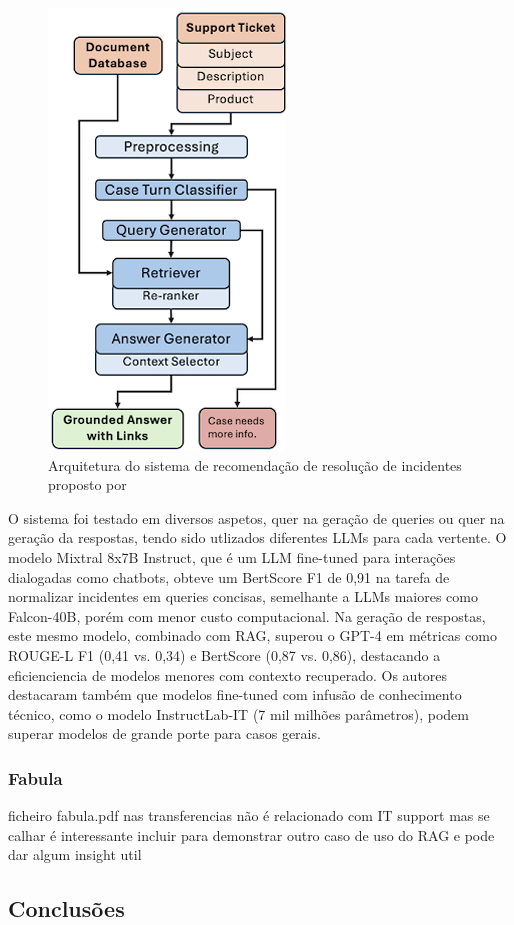 \begin{figure}[H]
        \centering
        \includegraphics[width=0.3\linewidth]{ch3/assets/ticket-recomendation-rag.png
        }
        \caption{Arquitetura do sistema de recomendação de resolução de incidentes proposto por  \cite{isaza2024retrieval}}
        \label{fig:ticket-recomendation-rag}
\end{figure}


O sistema foi testado em diversos aspetos, quer na geração de queries ou quer na geração da respostas, tendo sido utlizados diferentes LLMs para cada vertente. O modelo Mixtral 8x7B Instruct, que é um LLM fine-tuned para interações dialogadas como chatbots, obteve um BertScore F1 de 0,91 na tarefa de normalizar incidentes em queries concisas, semelhante a LLMs maiores como Falcon-40B, porém com menor custo computacional. Na geração de respostas, este mesmo modelo, combinado com RAG, superou o GPT-4 em métricas como ROUGE-L F1 (0,41 vs. 0,34) e BertScore (0,87 vs. 0,86), destacando a eficienciencia de modelos menores com contexto recuperado. Os autores destacaram também que modelos fine-tuned com infusão de conhecimento técnico, como o modelo InstructLab-IT (7 mil milhões parâmetros), podem superar modelos de grande porte para casos gerais. 



\subsubsection{Fabula}

ficheiro fabula.pdf nas transferencias
não é relacionado com IT support mas se calhar é interessante incluir para demonstrar outro caso de uso do RAG e pode dar algum insight util

\subsection{Conclusões}





